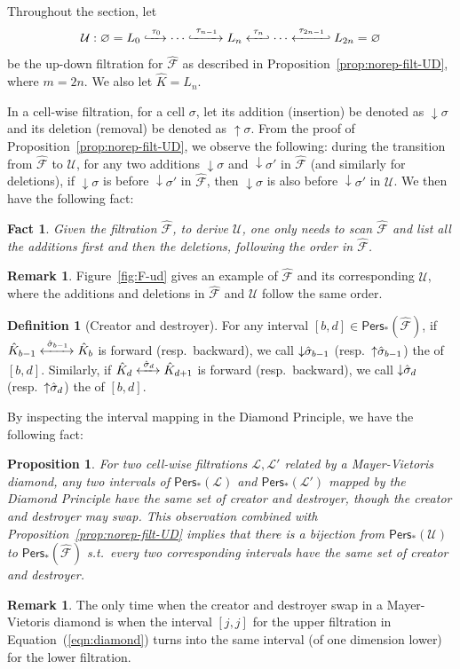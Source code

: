 \documentclass[letterpaper,11pt]{article}
\theoremstyle{mythmstyle}
\newtheorem{proposition}[theorem]{Proposition}
\newtheorem{fact}[theorem]{Fact}
\theoremstyle{mydefstyle}
\newtheorem{definition}{Definition}
\newtheorem{remark}{Remark}
\theoremstyle{plain}
\newtheorem{proposition}[theorem]{Proposition}
\newtheorem{fact}[theorem]{Fact}
\theoremstyle{definition}
\newtheorem{definition}[theorem]{Definition}
\newtheorem{remark}[theorem]{Remark}
\newcommand{\fnrsimp}[2]{\hat{\sigma}_{#2}}
\newcommand{\Pers}{\mathsf{Pers}}
\newcommand{\<}[1]{\langle #1\rangle}
\newcommand{\lbarrowspace}{\;}
\newcommand{\lrarrowsp}[1]{\xleftrightarrow{\lbarrowspace#1\lbarrowspace}}
\let\leftrightarrowsp\lrarrowsp
\newcommand{\inctosp}[1]{\xhookrightarrow{\lbarrowspace#1\lbarrowspace}}
\newcommand{\bakinctosp}[1]{\xhookleftarrow{\lbarrowspace#1\lbarrowspace}}
\let\emptyset\varnothing
\newcommand{\Fcal}{\mathcal{F}}
\newcommand{\Lcal}{\mathcal{L}}
\newcommand{\Ucal}{\mathcal{U}}
\newcommand{\sG}{\sigma}
\newcommand{\filtcnt}{m}
\newcommand{\simpcnt}{n}
\newcommand{\Fnr}{{\hat{\Fcal}}}
\newcommand{\ud}{\Ucal}
\newcommand{\ucplx}{L}
\newcommand{\usimp}{\tau}
\newcommand{\add}[1]{{\downarrow}#1}
\newcommand{\del}[1]{{\uparrow}#1}
\begin{document}
Throughout the section,
let
\[\ud:\emptyset=\ucplx_0\inctosp{\usimp_0} 
\cdots\inctosp{\usimp_{\simpcnt-1}} 
\ucplx_{\simpcnt}
\bakinctosp{\usimp_{\simpcnt}}
\cdots
\bakinctosp{\usimp_{2\simpcnt-1}} \ucplx_{2\simpcnt}=\emptyset\]
be the up-down filtration for $\Fnr$ 
as described in Proposition~\ref{prop:norep-filt-UD},
where $\filtcnt=2\simpcnt$.
We also let $\hat{K}=\ucplx_{\simpcnt}$.

In a cell-wise filtration,
for a cell $\sG$, let its addition (insertion) be denoted as $\add{\sG}$
and its deletion (removal) be denoted as $\del{\sG}$.
From the proof of Proposition~\ref{prop:norep-filt-UD},
we observe the following: during the transition from $\Fnr$ to $\ud$,
for any two additions $\add{\sG}$ and $\add{\sG'}$ in $\Fnr$ 
(and similarly for deletions),
if $\add{\sG}$ is before $\add{\sG'}$ in $\Fnr$,
then $\add{\sG}$ is also before $\add{\sG'}$ in $\ud$.
We then have the following fact:
\begin{fact}
Given the filtration $\Fnr$, to derive $\ud$, 
one only needs to scan $\Fnr$
and list all the additions first
and then the deletions, following the order in $\Fnr$.
\end{fact}
\begin{remark}
Figure~\ref{fig:F-ud} gives an example of $\Fnr$ and its corresponding $\ud$,
where the additions and deletions in $\Fnr$ and $\ud$
follow the same order.
\end{remark}

\begin{definition}[Creator and destroyer]
\label{dfn:creator-destroyer}
For any interval $[b,d]\in\Pers_*(\Fnr)$, if $\hat{K}_{b-1}\leftrightarrowsp{\fnrsimp_{b-1}}\hat{K}_b$
is forward  {\rm(}resp.\ backward{\rm)}, 
we call $\add{\fnrsimp_{b-1}}$ {\rm(}resp.\ $\del{\fnrsimp_{b-1}}${\rm)} the 
of $[b,d]$. 
Similarly, if $\hat{K}_{d}\leftrightarrowsp{\fnrsimp_{d}}\hat{K}_{d+1}$
is forward {\rm(}resp.\ backward{\rm)}, 
we call $\add{\fnrsimp_{d}}$ {\rm(}resp.\ $\del{\fnrsimp_{d}}${\rm)} the 
of $[b,d]$.
\end{definition}

By inspecting the interval mapping in the Diamond Principle,
we have the following fact:
\begin{proposition}\label{prop:creat-destr-same}
For two cell-wise filtrations $\Lcal,\Lcal'$ 
related by a Mayer-Vietoris diamond,
any two intervals of $\Pers_*(\Lcal)$ and $\Pers_*(\Lcal')$
mapped by the Diamond Principle
have the same set of creator and destroyer,
though the creator and destroyer may swap.
This observation combined with Proposition~\ref{prop:norep-filt-UD}
implies that there is a bijection from $\Pers_*(\ud)$ to $\Pers_*(\Fnr)$
s.t.\ every two corresponding intervals
have the same set of creator and destroyer.
\end{proposition}
\begin{remark}
The only time when the creator and destroyer swap
in a Mayer-Vietoris diamond
is when the interval $[j,j]$ for the upper filtration in Equation~(\ref{eqn:diamond}) 
turns into the same interval (of one dimension lower) for the lower filtration.
\label{rem:critical}
\end{remark}
\end{document}
